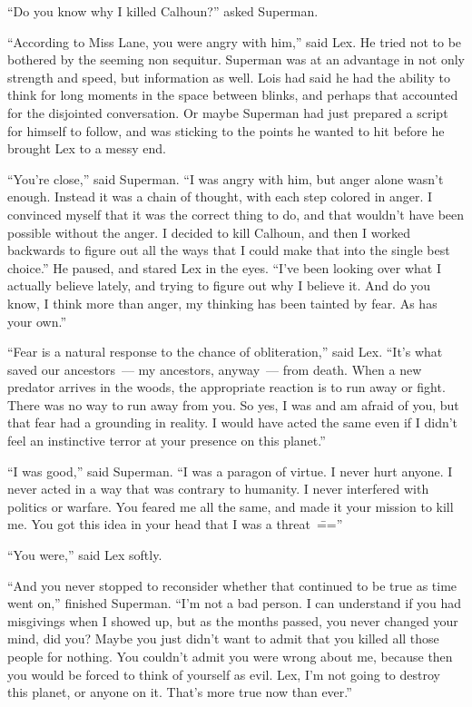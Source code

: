 \documentclass[ebook,12pt]{memoir}
\begin{document}
``Do you know why I killed Calhoun?'' asked Superman.

``According to Miss Lane, you were angry with him,'' said Lex. He tried
not to be bothered by the seeming non sequitur. Superman was at an
advantage in not only strength and speed, but information as well. Lois
had said he had the ability to think for long moments in the space
between blinks, and perhaps that accounted for the disjointed
conversation. Or maybe Superman had just prepared a script for himself
to follow, and was sticking to the points he wanted to hit before he
brought Lex to a messy end.

``You're close,'' said Superman. ``I was angry with him, but anger alone
wasn't enough. Instead it was a chain of thought, with each step colored
in anger. I convinced myself that it was the correct thing to do, and
that wouldn't have been possible without the anger. I decided to kill
Calhoun, and then I worked backwards to figure out all the ways that I
could make that into the single best choice.'' He paused, and stared Lex
in the eyes. ``I've been looking over what I actually believe lately,
and trying to figure out why I believe it. And do you know, I think more
than anger, my thinking has been tainted by fear. As has your own.''

``Fear is a natural response to the chance of obliteration,'' said Lex.
``It's what saved our ancestors~--- my ancestors, anyway~--- from death.
When a new predator arrives in the woods, the appropriate reaction is to
run away or fight. There was no way to run away from you. So yes, I was
and am afraid of you, but that fear had a grounding in reality. I would
have acted the same even if I didn't feel an instinctive terror at your
presence on this planet.''

``I was good,'' said Superman. ``I was a paragon of virtue. I never hurt
anyone. I never acted in a way that was contrary to humanity. I never
interfered with politics or warfare. You feared me all the same, and
made it your mission to kill me. You got this idea in your head that I
was a threat~\===''

``You were,'' said Lex softly.

``And you never stopped to reconsider whether that continued to be true
as time went on,'' finished Superman. ``I'm not a bad person. I can
understand if you had misgivings when I showed up, but as the months
passed, you never changed your mind, did you? Maybe you just didn't want
to admit that you killed all those people for nothing. You couldn't
admit you were wrong about me, because then you would be forced to think
of yourself as evil. Lex, I'm not going to destroy this planet, or
anyone on it. That's more true now than ever.''
\end{document}
